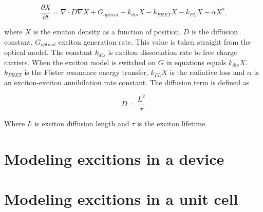 \begin{equation}
\label{eq:exciton}
\frac{\partial X}{\partial t} = \nabla \cdot D \nabla X +G_{optical} -k_{dis} X -k_{FRET} X- k_{PL} X-\alpha X^2.
\end{equation}

where $X$ is the exciton density as a function of position, $D$ is the diffusion constant, $G_{optical}$ exciton generation rate. This value is taken straight from the optical model.  The constant $k_{dis}$ is exciton dissociation rate to free charge carriers.  When the exciton model is switched on $G$ in equations equals $k_{dis} X$. $k_{FRET}$ is the F\"{o}ster resonance energy transfer, $k_{PL} X$ is the radiative loss and $\alpha$ is an exciton-exciton annihilation rate constant.  The diffusion term is defined as 

\begin{equation}
\label{eq:exciton}
D=\frac{L^2}{\tau}
\end{equation}

Where $L$ is exciton diffusion length and $\tau$ is the exciton lifetime.

\section{Modeling excitions in a device}

\section{Modeling excitions in a unit cell}
